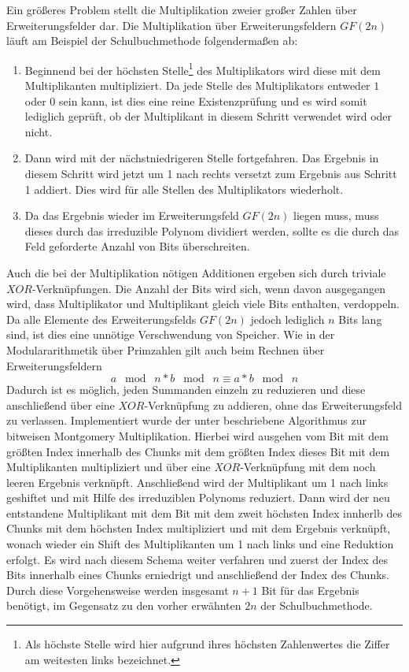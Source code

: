 Ein größeres Problem stellt die Multiplikation zweier großer Zahlen über Erweiterungsfelder dar. Die Multiplikation über Erweiterungsfeldern $GF(2n)$ läuft am Beispiel der Schulbuchmethode folgendermaßen ab:
\begin{enumerate}
\item Beginnend bei der höchsten Stelle\footnote{Als höchste Stelle wird hier aufgrund ihres höchsten Zahlenwertes die Ziffer am weitesten links bezeichnet.} des Multiplikators wird diese mit dem Multiplikanten multipliziert. Da jede Stelle des Multiplikators entweder $1$ oder $0$ sein kann, ist dies eine reine Existenzprüfung und es wird somit lediglich geprüft, ob der Multiplikant in diesem Schritt verwendet wird oder nicht.
\item Dann wird mit der nächstniedrigeren Stelle fortgefahren. Das Ergebnis in diesem Schritt wird jetzt um 1 nach rechts versetzt zum Ergebnis aus Schritt 1 addiert. Dies wird für alle Stellen des Multiplikators wiederholt. 
\item Da das Ergebnis wieder im Erweiterungsfeld $GF(2n)$ liegen muss, muss dieses durch das irreduzible Polynom dividiert werden, sollte es die durch das Feld geforderte Anzahl von Bits überschreiten.
\end{enumerate}
Auch die bei der Multiplikation nötigen Additionen ergeben sich durch triviale $XOR$-Verknüpfungen. Die Anzahl der Bits wird sich, wenn davon ausgegangen wird, dass Multiplikator und Multiplikant gleich viele Bits enthalten, verdoppeln. Da alle Elemente des Erweiterungsfelds $GF(2n)$ jedoch lediglich $n$ Bits lang sind, ist dies eine unnötige Verschwendung von Speicher. Wie in der Modulararithmetik über Primzahlen gilt auch beim Rechnen über Erweiterungsfeldern
$$
a \;\bmod\; n * b \;\bmod\; n \equiv a * b \;\bmod\; n
$$
Dadurch ist es möglich, jeden Summanden einzeln zu reduzieren und diese anschließend über eine $XOR$-Verknüpfung zu addieren, ohne das Erweiterungsfeld zu verlassen. Implementiert wurde der unter \cite{Cetin:1998} beschriebene Algorithmus zur bitweisen Montgomery Multiplikation. Hierbei wird ausgehen vom Bit mit dem größten Index innerhalb des Chunks mit dem größten Index dieses Bit mit dem Multiplikanten multipliziert und über eine $XOR$-Verknüpfung mit dem noch leeren Ergebnis verknüpft. Anschließend wird der Multiplikant um 1 nach links geshiftet und mit Hilfe des irreduziblen Polynoms reduziert. Dann wird der neu entstandene Multiplikant mit dem Bit mit dem zweit höchsten Index innherlb des Chunks mit dem höchsten Index multipliziert und mit dem Ergebnis verknüpft, wonach wieder ein Shift des Multiplikanten um 1 nach links und eine Reduktion erfolgt. Es wird nach diesem Schema weiter verfahren und zuerst der Index des Bits innerhalb eines Chunks erniedrigt und anschließend der Index des Chunks. Durch diese Vorgehensweise werden insgesamt $n+1$ Bit für das Ergebnis benötigt, im Gegensatz zu den vorher erwähnten $2n$ der Schulbuchmethode.\newline
